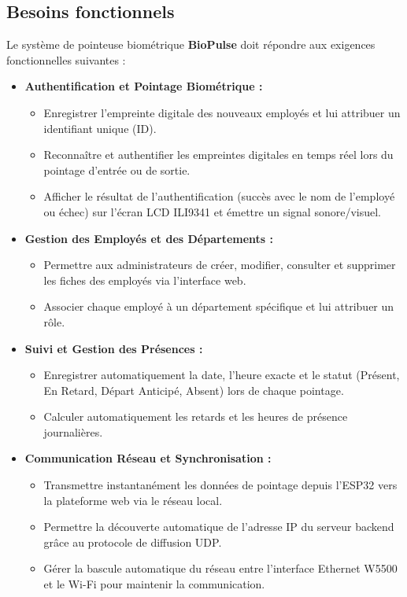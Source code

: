 \documentclass[12pt,a4paper]{report}
\begin{document}
\subsection{Besoins fonctionnels}
Le système de pointeuse biométrique \textbf{BioPulse} doit répondre aux exigences fonctionnelles suivantes :
\begin{itemize}
    \item \textbf{Authentification et Pointage Biométrique :}
    \begin{itemize}
        \item Enregistrer l'empreinte digitale des nouveaux employés et lui attribuer un identifiant unique (ID).
        \item Reconnaître et authentifier les empreintes digitales en temps réel lors du pointage d'entrée ou de sortie.
        \item Afficher le résultat de l'authentification (succès avec le nom de l'employé ou échec) sur l'écran LCD ILI9341 et émettre un signal sonore/visuel.
    \end{itemize}
    \item \textbf{Gestion des Employés et des Départements :}
    \begin{itemize}
        \item Permettre aux administrateurs de créer, modifier, consulter et supprimer les fiches des employés via l'interface web.
        \item Associer chaque employé à un département spécifique et lui attribuer un rôle.
    \end{itemize}
    \item \textbf{Suivi et Gestion des Présences :}
    \begin{itemize}
        \item Enregistrer automatiquement la date, l'heure exacte et le statut (Présent, En Retard, Départ Anticipé, Absent) lors de chaque pointage.
        \item Calculer automatiquement les retards et les heures de présence journalières.
    \end{itemize}
    \item \textbf{Communication Réseau et Synchronisation :}
    \begin{itemize}
        \item Transmettre instantanément les données de pointage depuis l'ESP32 vers la plateforme web via le réseau local.
        \item Permettre la découverte automatique de l'adresse IP du serveur backend grâce au protocole de diffusion UDP.
        \item Gérer la bascule automatique du réseau entre l'interface Ethernet W5500 et le Wi-Fi pour maintenir la communication.
    \end{itemize}
\end{itemize}
\end{document}
